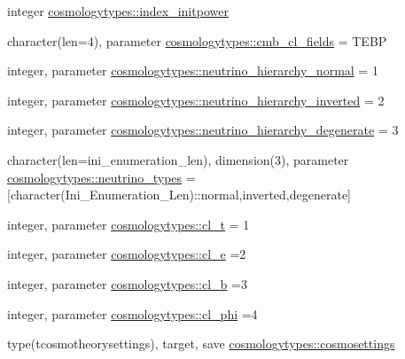 \begin{DoxyCompactItemize}
\item 
integer \mbox{\hyperlink{namespacecosmologytypes_abb690edf45f7746cb6d70d0ee85c57a1}{cosmologytypes\+::index\+\_\+initpower}}
\item 
character(len=4), parameter \mbox{\hyperlink{namespacecosmologytypes_a59f0f294178f05545934eb7dd63928b6}{cosmologytypes\+::cmb\+\_\+cl\+\_\+fields}} = \textquotesingle{}T\+E\+BP\textquotesingle{}
\item 
integer, parameter \mbox{\hyperlink{namespacecosmologytypes_ac77eac54651ec04a99342a063e413398}{cosmologytypes\+::neutrino\+\_\+hierarchy\+\_\+normal}} = 1
\item 
integer, parameter \mbox{\hyperlink{namespacecosmologytypes_a61a310ab75549fa17f2c5dbd9ec7e638}{cosmologytypes\+::neutrino\+\_\+hierarchy\+\_\+inverted}} = 2
\item 
integer, parameter \mbox{\hyperlink{namespacecosmologytypes_add030eb1dcdea0a5221e749a63870ee2}{cosmologytypes\+::neutrino\+\_\+hierarchy\+\_\+degenerate}} = 3
\item 
character(len=ini\+\_\+enumeration\+\_\+len), dimension(3), parameter \mbox{\hyperlink{namespacecosmologytypes_a6c895faee0146a00099a99e8caa7b0b1}{cosmologytypes\+::neutrino\+\_\+types}} = \mbox{[}character(Ini\+\_\+\+Enumeration\+\_\+\+Len)\+::\textquotesingle{}normal\textquotesingle{},\textquotesingle{}inverted\textquotesingle{},\textquotesingle{}degenerate\textquotesingle{}\mbox{]}
\item 
integer, parameter \mbox{\hyperlink{namespacecosmologytypes_abddefae1172ac2704cb3a3b22704aaa1}{cosmologytypes\+::cl\+\_\+t}} = 1
\item 
integer, parameter \mbox{\hyperlink{namespacecosmologytypes_aded7f72c34bf738967d5fb32e4edc1e3}{cosmologytypes\+::cl\+\_\+e}} =2
\item 
integer, parameter \mbox{\hyperlink{namespacecosmologytypes_a59dfbed9693b76beb42a0c48ec80b388}{cosmologytypes\+::cl\+\_\+b}} =3
\item 
integer, parameter \mbox{\hyperlink{namespacecosmologytypes_a25e618d45dab8f1c5092d92e772f81d0}{cosmologytypes\+::cl\+\_\+phi}} =4
\item 
type(tcosmotheorysettings), target, save \mbox{\hyperlink{namespacecosmologytypes_a6456ff7e508a263c46d00481a14d3389}{cosmologytypes\+::cosmosettings}}
\end{DoxyCompactItemize}
